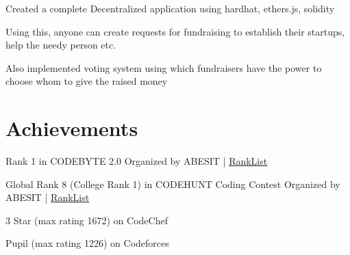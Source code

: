 \documentclass[letterpaper]{deedy-resume} %
\begin{document}
\begin{minipage}[t]{0.52\textwidth}
\subsubsectionspace

\begin{tightitemize}
\item Created a complete Decentralized application using hardhat, ethers.js, solidity
\item Using this, anyone can create requests for fundraising to establish their startups, help the needy person etc.
\item Also implemented voting system using which fundraisers have the power to choose whom to give the raised money 
\end{tightitemize}

\sectionspace

\section{Achievements}
\subsubsectionspace
\vspace{\topsep}
\begin{tightitemize}
\item Rank 1 in CODEBYTE 2.0 Organized by ABESIT | \href{https://www.codechef.com/rankings/CBT22022?itemsPerPage=100&order=asc&page=1&sortBy=rank}{RankList}
\item Global Rank 8 (College Rank 1) in CODEHUNT Coding Contest Organized by ABESIT | \href{https://www.codechef.com/rankings/CHNT2022?itemsPerPage=100&order=asc&page=1&sortBy=rank}{RankList}
\item 3 Star (max rating 1672) on CodeChef
\item Pupil (max rating 1226) on Codeforces
\end{tightitemize}






\end{minipage} %
\end{document}
